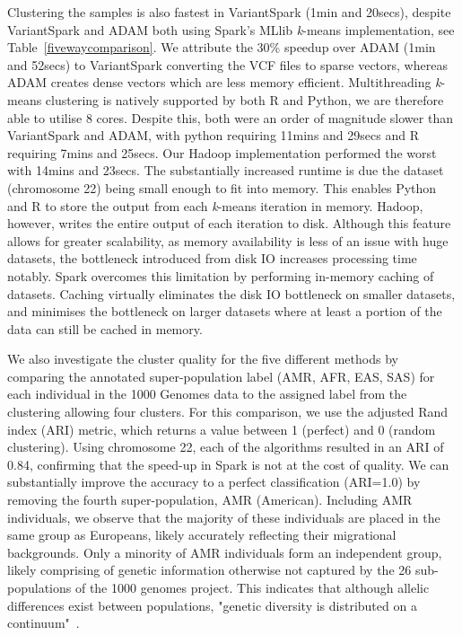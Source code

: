 \documentclass{bmcart}
\newcommand{\variantSpark}{{\sc VariantSpark}}
\newcommand{\kMeans}{\textit{k}-means}
\newcommand{\ARI}{adjusted Rand index}
\begin{document}
Clustering the samples is also fastest in \variantSpark{} (1min and 20secs), despite \variantSpark{} and ADAM both using {\sc Spark}'s MLlib \kMeans{} implementation, see Table~\ref{fivewaycomparison}.
We attribute the 30\% speedup over ADAM (1min and 52secs) to \variantSpark{} converting the VCF files to sparse vectors, whereas ADAM creates dense vectors which are less memory efficient.
Multithreading \kMeans{} clustering is natively supported by both R and Python, we are therefore able to utilise 8 cores. 
Despite this, both were an order of magnitude slower than \variantSpark{} and ADAM, with python requiring 11mins and 29secs and R requiring 7mins and 25secs.
Our Hadoop implementation performed the worst with 14mins and 23secs.
The substantially increased runtime is due the dataset (chromosome 22) being small enough to fit into memory. This enables Python and R to store the output from each \kMeans{} iteration in memory. Hadoop, however, writes the entire output of each iteration to disk.
Although this feature allows for greater scalability, as memory availability is less of an issue with huge datasets, the bottleneck introduced from disk IO increases processing time notably.
{\sc Spark} overcomes this limitation by performing in-memory caching of datasets. Caching virtually eliminates the disk IO bottleneck on smaller datasets, and minimises the bottleneck on larger datasets where at least a portion of the data can still be cached in memory.

We also investigate the cluster quality for the five different methods by comparing the annotated super-population label (AMR, AFR, EAS, SAS) for each individual in the 1000 Genomes data to the assigned label from the clustering allowing four clusters. 
For this comparison, we use the \ARI{} (ARI) metric, which returns a value between 1 (perfect) and 0 (random clustering). 
Using chromosome 22, each of the algorithms resulted in an ARI of 0.84, confirming that the speed-up in {\sc Spark} is not at the cost of quality.
We can substantially improve the accuracy to a perfect classification (ARI=1.0) by removing the fourth super-population, AMR (American). 
Including AMR individuals, we observe that the majority of these individuals are placed in the same group as Europeans, likely accurately reflecting their migrational backgrounds. 
Only a minority of AMR individuals form an independent group, likely comprising of genetic information otherwise not captured by the 26 sub-populations of the 1000 genomes project.
This indicates that although allelic differences exist between populations, "genetic diversity is distributed on a continuum"~\cite{Hunter2014}.
\end{document}
